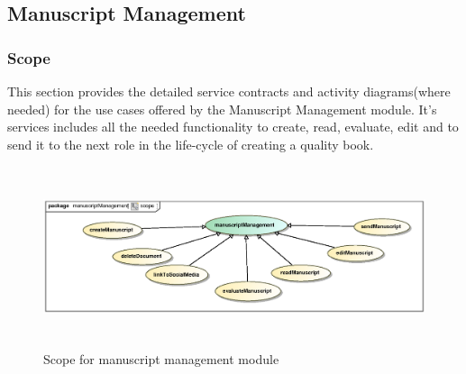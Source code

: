 \subsection{Manuscript Management}

\subsubsection{Scope}
\par{This section provides the detailed service contracts and activity diagrams(where needed) for the use cases offered by the Manuscript Management module.
It's services includes all the needed functionality to create, read, evaluate, edit and to send it to the next role in the life-cycle of creating a quality book.}

\begin{figure}[h]
	\includegraphics[height=200px, width=500px]{epsImages/ManuscriptManagement/scope.eps}
	\caption{Scope for manuscript management module}
\end{figure}

\newpage

